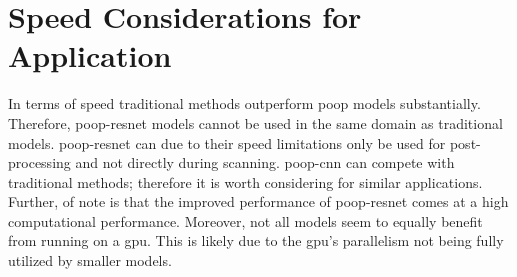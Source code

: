 \section{Speed Considerations for Application}
\label{ch:Discussion:Applications}

In terms of speed traditional methods outperform \ac{poop} models substantially. Therefore, \ac{poop}-\ac{resnet} models cannot be used in the same domain as traditional models. \Ac{poop}-\ac{resnet} can due to their speed limitations only be used for post-processing and not directly during scanning. \Ac{poop}-\ac{cnn} can compete with traditional methods; therefore it is worth considering for similar applications. Further, of note is that the improved performance of \Ac{poop}-\ac{resnet} comes at a high computational performance. Moreover, not all models seem to equally benefit from running on a \ac{gpu}. This is likely due to the \ac{gpu}'s parallelism not being fully utilized by smaller models.

